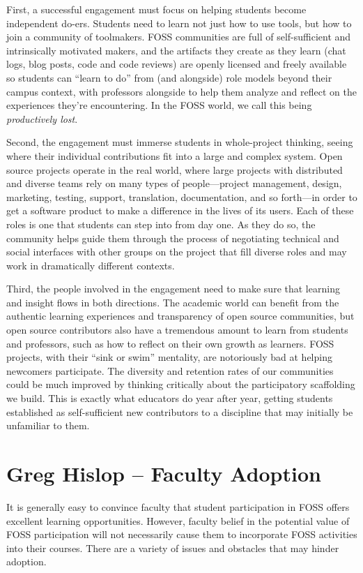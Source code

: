 \documentclass{sig-alternate}
\begin{document}
First, a successful engagement must focus on helping students become independent do-ers. %
Students need to learn not just how to use tools, but how to join a community of toolmakers. FOSS communities are full of self-sufficient and intrinsically motivated makers, and the artifacts they create as they learn (chat logs, blog posts, code and code reviews) are openly licensed and freely available so students can ``learn to do'' from (and alongside) role models beyond their campus context, with professors alongside to help them analyze and reflect on the experiences they're encountering. In the FOSS world, we call this being {\em productively lost}.

Second, the engagement must immerse students in whole-project thinking, seeing where their individual contributions fit into a large and complex system. Open source projects operate in the real world, where large projects with distributed and diverse teams rely on many types of people---project management, design, marketing, testing, support, translation, documentation,  and so forth---in order to get a software product to make a difference in the lives of its users. Each of these roles is one that students can step into from day one. As they do so, the community helps guide them through the process of negotiating technical and social interfaces with other groups on the project that fill diverse roles and may work in dramatically different contexts.

Third, the people involved in the engagement need to make sure that learning and insight flows in both directions. The academic world can benefit from the authentic learning experiences and transparency of open source communities, but open source contributors also have a tremendous amount to learn from students and professors, such as how to reflect on their own growth as learners. FOSS projects, with their ``sink or swim'' mentality, are notoriously bad at helping newcomers participate. The diversity and retention rates of our communities could be much improved by thinking critically about the participatory scaffolding we build.  This is exactly what educators do year after year, getting students established as self-sufficient new contributors to a discipline that may initially be unfamiliar to them.

\section{Greg Hislop -- Faculty Adoption}        
It is generally easy to convince faculty that student participation in FOSS offers excellent learning opportunities.  However, faculty belief in the potential value of FOSS participation will not necessarily cause them to incorporate FOSS activities into their courses.  There are a variety of issues and obstacles that may hinder adoption.
\end{document}
